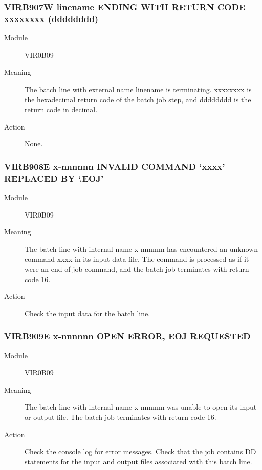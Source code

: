 \documentclass[letterpaper,10pt,english]{sphinxmanual}
\begin{document}
\subsubsection{VIRB907W linename ENDING WITH RETURN CODE xxxxxxxx (dddddddd)}
\label{\detokenize{messages:virb907w-linename-ending-with-return-code-xxxxxxxx-dddddddd}}\begin{description}
\item[{Module}] \leavevmode
VIR0B09

\item[{Meaning}] \leavevmode
The batch line with external name linename is terminating. xxxxxxxx is the hexadecimal return code of the batch job step, and dddddddd is the return code in decimal.

\item[{Action}] \leavevmode
None.

\end{description}


\subsubsection{VIRB908E x-nnnnnn INVALID COMMAND ‘xxxx’ REPLACED BY ‘.EOJ’}
\label{\detokenize{messages:virb908e-x-nnnnnn-invalid-command-xxxx-replaced-by-eoj}}\begin{description}
\item[{Module}] \leavevmode
VIR0B09

\item[{Meaning}] \leavevmode
The batch line with internal name x-nnnnnn has encountered an unknown command xxxx in its input data file. The command is processed as if it were an end of job command, and the batch job terminates with return code 16.

\item[{Action}] \leavevmode
Check the input data for the batch line.

\end{description}


\subsubsection{VIRB909E x-nnnnnn OPEN ERROR, EOJ REQUESTED}
\label{\detokenize{messages:virb909e-x-nnnnnn-open-error-eoj-requested}}\begin{description}
\item[{Module}] \leavevmode
VIR0B09

\item[{Meaning}] \leavevmode
The batch line with internal name x-nnnnnn was unable to open its input or output file. The batch job terminates with return code 16.

\item[{Action}] \leavevmode
Check the console log for error messages. Check that the job contains DD statements for the input and output files associated with this batch line.

\end{description}
\end{document}
